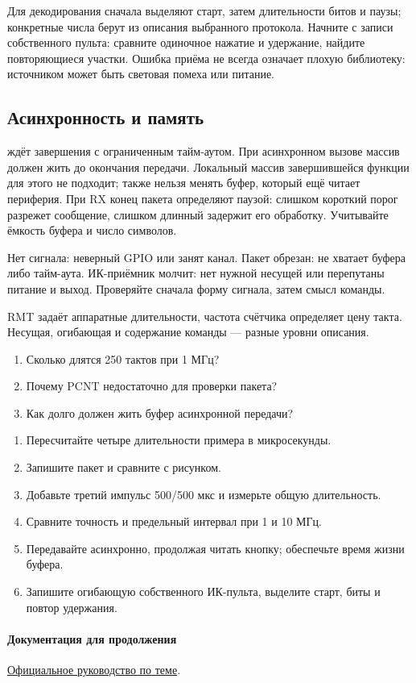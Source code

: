 Для декодирования сначала выделяют старт, затем длительности битов и паузы; конкретные
числа берут из описания выбранного протокола. Начните с записи собственного пульта:
сравните одиночное нажатие и удержание, найдите повторяющиеся участки. Ошибка приёма
не всегда означает плохую библиотеку: источником может быть световая помеха или питание.

\subsection{Асинхронность и память}
 ждёт завершения с ограниченным тайм-аутом. При асинхронном вызове массив
должен жить до окончания передачи. Локальный массив завершившейся функции для этого не подходит;
также нельзя менять буфер, который ещё читает периферия.
При RX конец пакета определяют паузой: слишком короткий порог разрежет сообщение,
слишком длинный задержит его обработку. Учитывайте ёмкость буфера и число символов.

\begin{trouble}
Нет сигнала: неверный GPIO или занят канал. Пакет обрезан: не хватает буфера либо тайм-аута.
ИК-приёмник молчит: нет нужной несущей или перепутаны питание и выход.
Проверяйте сначала форму сигнала, затем смысл команды.
\end{trouble}
\begin{summary}
RMT задаёт аппаратные длительности, частота счётчика определяет цену такта.
Несущая, огибающая и содержание команды --- разные уровни описания.
\end{summary}

\begin{selfcheck}
\begin{enumerate}
\item Сколько длятся 250 тактов при 1 МГц?
\item Почему PCNT недостаточно для проверки пакета?
\item Как долго должен жить буфер асинхронной передачи?
\end{enumerate}
\end{selfcheck}
\begin{tasks}
\begin{enumerate}
\item {} Пересчитайте четыре длительности примера в микросекунды.
\item {} Запишите пакет и сравните с рисунком.
\item {} Добавьте третий импульс 500/500 мкс и измерьте общую длительность.
\item {} Сравните точность и предельный интервал при 1 и 10 МГц.
\item {} Передавайте асинхронно, продолжая читать кнопку; обеспечьте время жизни буфера.
\item {} Запишите огибающую собственного ИК-пульта, выделите старт, биты и повтор удержания.
\end{enumerate}
\end{tasks}

\paragraph{Документация для продолжения}\href{https://docs.espressif.com/projects/arduino-esp32/en/latest/api/rmt.html}{Официальное руководство по теме}.
